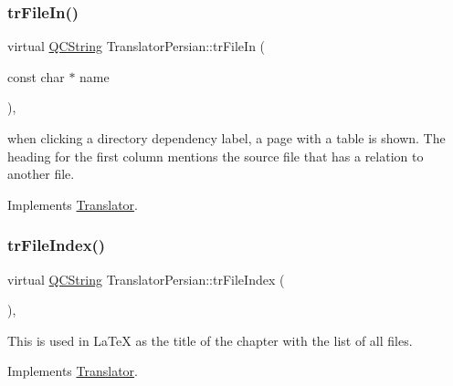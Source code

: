 \mbox{\label{class_translator_persian_a01b3230c895220cf87a69fef63b62a4c}} 
\subsubsection{\texorpdfstring{trFileIn()}{trFileIn()}}
{\footnotesize\ttfamily virtual \mbox{\hyperlink{class_q_c_string}{Q\+C\+String}} Translator\+Persian\+::tr\+File\+In (\begin{DoxyParamCaption}\item[{const char $\ast$}]{name }\end{DoxyParamCaption})\hspace{0.3cm}{\ttfamily [inline]}, {\ttfamily [virtual]}}

when clicking a directory dependency label, a page with a table is shown. The heading for the first column mentions the source file that has a relation to another file. 

Implements \mbox{\hyperlink{class_translator}{Translator}}.

\mbox{\label{class_translator_persian_a95cbcdf1c33b3b9b19569f01d55c80cb}} 
\subsubsection{\texorpdfstring{trFileIndex()}{trFileIndex()}}
{\footnotesize\ttfamily virtual \mbox{\hyperlink{class_q_c_string}{Q\+C\+String}} Translator\+Persian\+::tr\+File\+Index (\begin{DoxyParamCaption}{ }\end{DoxyParamCaption})\hspace{0.3cm}{\ttfamily [inline]}, {\ttfamily [virtual]}}

This is used in La\+TeX as the title of the chapter with the list of all files. 

Implements \mbox{\hyperlink{class_translator}{Translator}}.

\mbox{\label{class_translator_persian_ab4d7fc6fb4aeb339be129a5bf24ac181}} 
